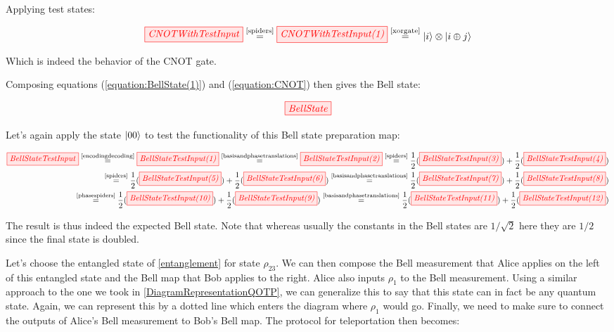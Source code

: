 \documentclass[]{article}
\newcommand{\equaltext}[1]{\ensuremath{\stackrel{\text{#1}}{=}}}
\begin{document}
Applying test states:

\begin{equation}
	\tikzfig{CNOTWithTestInput} \equaltext{\ref{spiders}} \tikzfig{CNOTWithTestInput(1)} \equaltext{\ref{xorgate}} \ket{i} \otimes \ket{i \oplus j}
\end{equation}

Which is indeed the behavior of the CNOT gate.

Composing equations (\ref{equation:BellState(1)}) and (\ref{equation:CNOT}) then gives the Bell state:

\begin{equation}
	\tikzfig{BellState}
\end{equation}

Let's again apply the state $\ket{00}$ to test the functionality of this Bell state preparation map:

\begin{equation}
\label{BellStateTestInput}
	\begin{split}
	\tikzfig{BellStateTestInput} \equaltext{\ref{encodingdecoding}} \tikzfig{BellStateTestInput(1)} \equaltext{\ref{basisandphasetranslations}} \tikzfig{BellStateTestInput(2)} \equaltext{\ref{spiders}} \frac{1}{2}(\tikzfig{BellStateTestInput(3)}) + \frac{1}{2}(\tikzfig{BellStateTestInput(4)}) \\ \equaltext{\ref{spiders}} \frac{1}{2}(\tikzfig{BellStateTestInput(5)}) +
	\frac{1}{2}(\tikzfig{BellStateTestInput(6)}) 
	\equaltext{\ref{basisandphasetranslations}} \frac{1}{2}(\tikzfig{BellStateTestInput(7)}) + \frac{1}{2}(\tikzfig{BellStateTestInput(8)}) \\ \equaltext{\ref{phasespiders}}
	\frac{1}{2}(\tikzfig{BellStateTestInput(10)}) +
	 \frac{1}{2}(\tikzfig{BellStateTestInput(9)}) 
	 \equaltext{\ref{basisandphasetranslations}} \frac{1}{2}(\tikzfig{BellStateTestInput(11)}) +
	\frac{1}{2}(\tikzfig{BellStateTestInput(12)})
	\end{split}
\end{equation}

The result is thus indeed the expected Bell state. Note that whereas usually the constants in the Bell states are $1/\sqrt{2}$ here they are $1/2$ since the final state is doubled.

Let's choose the entangled state of \ref{entanglement} for state $\rho_{23}$. We can then compose the Bell measurement that Alice applies on the left of this entangled state and the Bell map that Bob applies to the right. Alice also inputs $\rho_1$ to the Bell measurement. Using a similar approach to the one we took in \ref{DiagramRepresentationQOTP}, we can generalize this to say that this state can in fact be any quantum state. Again, we can represent this by a dotted line which enters the diagram where $\rho_1$ would go. Finally, we need to make sure to connect the outputs of Alice's Bell measurement to Bob's Bell map. The protocol for teleportation then becomes: 
 
\end{document}
